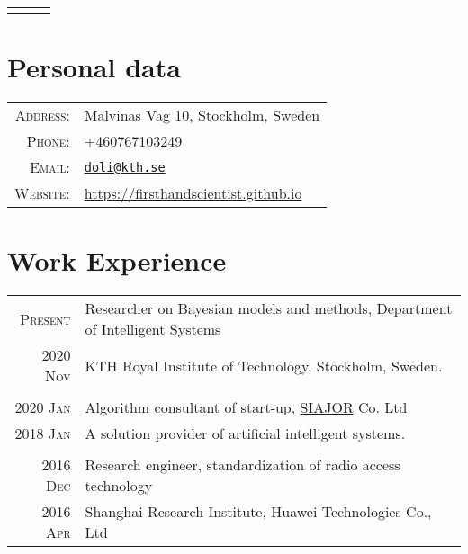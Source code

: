 \documentclass[a4paper,10pt]{article}
\begin{document}
\pagestyle{empty}


\begin{center}
  \begin{tabular}{lcr}
    \par{\centering{\Huge Dong Liu}\bigskip\par} & & %
  \end{tabular}
\end{center}

\section{Personal data}

\begin{tabular}{rl}
  \textsc{Address:} & Malvinas Vag 10, Stockholm, Sweden \\
  \textsc{Phone:} & +460767103249 \\
  \textsc{Email:} & \href{mailto:doli@kth.se}{\nolinkurl{doli@kth.se}} \\
  \textsc{Website:} & \href{https://firsthandscientist.github.io}{https://firsthandscientist.github.io}\\
\end{tabular}


\section{Work Experience}
\begin{tabular}{r|p{13cm}}
  \textsc{Present}  & Researcher on Bayesian models and methods, Department of Intelligent Systems \\
  \textsc{2020 Nov}  & KTH Royal Institute of Technology, Stockholm, Sweden.\\
  \multicolumn{2}{c}{} \\

  \textsc{2020 Jan}  & Algorithm consultant of start-up, \href{http://www.siajor.com/}{SIAJOR} Co. Ltd \\
  \textsc{2018 Jan}  & A solution provider of artificial intelligent systems. \\
  \multicolumn{2}{c}{} \\

  \textsc{2016 Dec}  & Research engineer, standardization of radio access technology  \\
  \textsc{2016 Apr}  & Shanghai Research Institute, Huawei Technologies Co., Ltd \\
\end{tabular}
\end{document}

